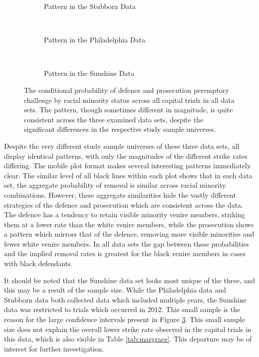 \begin{figure}[h!]
  \centering
  \begin{subfigure}{0.4\textwidth}
    \caption{\footnotesize Pattern in the Stubborn Data}
    \label{fig:stubcomp}
  \end{subfigure}
  ~
  \begin{subfigure}{0.4\textwidth}
    \caption{\footnotesize Pattern in the Philadelphia Data}
    \label{fig:philcomp}
  \end{subfigure}
  ~
  \begin{subfigure}{0.4\textwidth}
    \caption{\footnotesize Pattern in the Sunshine Data}
    \label{fig:suncomp}
  \end{subfigure}
  \caption[Strikes by Race and Defendant Race (All Capital Trial Data)]
  {\footnotesize The conditional probability of defence and prosecution peremptory challenge by racial minority status across all
    capital trials in all data sets. The pattern, though sometimes different in magnitude, is quite consistent across the three
    examined data sets, despite the significant differences in the respective study sample universes.}
  \label{fig:racedefalldata}
\end{figure}

Despite the very different study sample universes of these three data sets, all display identical patterns, with only the
magnitudes of the different strike rates differing. The mobile plot format makes several interesting patterns immediately
clear. The similar level of all black lines within each plot shows that in each data set, the aggregate probability of removal is
similar across racial minority combinations. However, these aggregate similarities hide the vastly different strategies of the
defence and prosecution which are consistent across the data. The defence has a tendency to retain visible minority venire
members, striking them at a lower rate than the white venire members, while the prosecution shows a pattern which mirrors that of
the defence, removing more visible minorities and fewer white venire members. In all data sets the gap between these probabilities
and the implied removal rates is greatest for the black venire members in cases with black defendants.

It should be noted that the Sunshine data set looks most unique of the three, and this may be a result of the sample size. While
the Philadelphia data and Stubborn data both collected data which included multiple years, the Sunshine data was restricted to
trials which occurred in 2012. This small sample is the reason for the large confidence intervals present in Figure
\ref{fig:suncomp}. This small sample size does not explain the overall lower strike rate observed in the capital trials in this
data, which is also visible in Table \ref{tab:margrace}. This departure may be of interest for further investigation.

